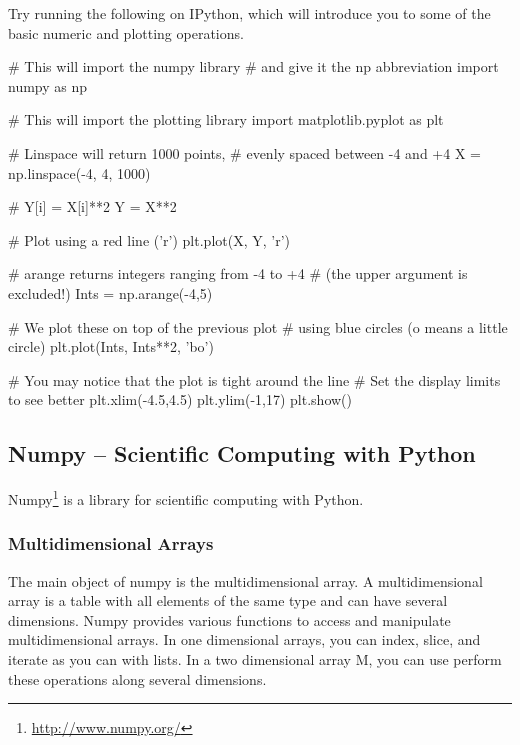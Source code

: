 \begin{exercise}
Try running the following on IPython, which will introduce you to some of the basic numeric and plotting operations.

\begin{python}
# This will import the numpy library
# and give it the np abbreviation
import numpy as np

# This will import the plotting library
import matplotlib.pyplot as plt

# Linspace will return 1000 points,
# evenly spaced between -4 and +4
X = np.linspace(-4, 4, 1000)

# Y[i] = X[i]**2
Y = X**2

# Plot using a red line ('r')
plt.plot(X, Y, 'r')

# arange returns integers ranging from -4 to +4
# (the upper argument is excluded!)
Ints = np.arange(-4,5)

# We plot these on top of the previous plot
# using blue circles (o means a little circle)
plt.plot(Ints, Ints**2, 'bo')

# You may notice that the plot is tight around the line
# Set the display limits to see better
plt.xlim(-4.5,4.5)
plt.ylim(-1,17)
plt.show()
\end{python}
\end{exercise}


\subsection{Numpy -- Scientific Computing with Python}

Numpy\footnote{\url{http://www.numpy.org/}} is a library for scientific computing with Python.

\subsubsection{Multidimensional Arrays}

The main object of numpy is the multidimensional array. A multidimensional array is a table with all elements of the same type and can have several dimensions. Numpy provides various functions to access and manipulate multidimensional arrays. In one dimensional arrays, you can index, slice, and iterate as you can with lists. In a two dimensional array M, you can use perform these operations along several dimensions.

